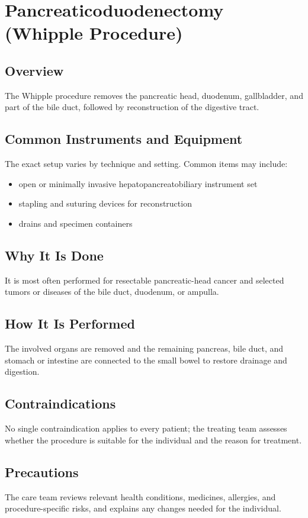 \chapter{Pancreaticoduodenectomy (Whipple Procedure)}
\section*{Overview}
The Whipple procedure removes the pancreatic head, duodenum, gallbladder, and part of the bile duct, followed by reconstruction of the digestive tract.
\section*{Common Instruments and Equipment}
The exact setup varies by technique and setting. Common items may include:
\begin{itemize}[nosep,leftmargin=*]
  \item open or minimally invasive hepatopancreatobiliary instrument set
  \item stapling and suturing devices for reconstruction
  \item drains and specimen containers
\end{itemize}

\section*{Why It Is Done}
It is most often performed for resectable pancreatic-head cancer and selected tumors or diseases of the bile duct, duodenum, or ampulla.
\section*{How It Is Performed}
The involved organs are removed and the remaining pancreas, bile duct, and stomach or intestine are connected to the small bowel to restore drainage and digestion.
\section*{Contraindications}
No single contraindication applies to every patient; the treating team assesses whether the procedure is suitable for the individual and the reason for treatment.

\section*{Precautions}
The care team reviews relevant health conditions, medicines, allergies, and procedure-specific risks, and explains any changes needed for the individual.

